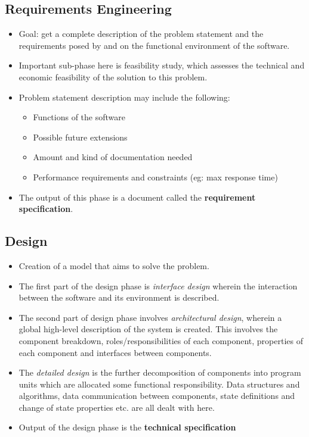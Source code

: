 \documentclass{article}
\begin{document}
\subsection{Requirements Engineering}
\begin{itemize}
    \item Goal: get a complete description of the problem statement and the requirements posed by and on the functional environment of the software. 
    
    \item Important sub-phase here is feasibility study, which assesses the technical and economic feasibility of the solution to this problem. 
    
    \item Problem statement description may include the following:
    \begin{itemize}
        \item Functions of the software
        
        \item Possible future extensions
        
        \item Amount and kind of documentation needed
        
        \item Performance requirements and constraints (eg: max response time)
    \end{itemize}
    
    \item The output of this phase is a document called the \textbf{requirement specification}. 
\end{itemize}

\subsection{Design}
\begin{itemize}
    \item Creation of a model that aims to solve the problem.
    
    \item The first part of the design phase is \textit{interface design} wherein the interaction between the software and its environment is described. 
    
    \item The second part of design phase involves \textit{architectural design}, wherein a global high-level description of the system is created. This involves the component breakdown, roles/responsibilities of each component, properties of each component and interfaces between components. 
    
    \item The \textit{detailed design} is the further decomposition of components into program units which are allocated some functional responsibility. Data structures and algorithms, data communication between components, state definitions and change of state properties etc. are all dealt with here. 
    
    \item Output of the design phase is the \textbf{technical specification}
\end{itemize}
\end{document}

